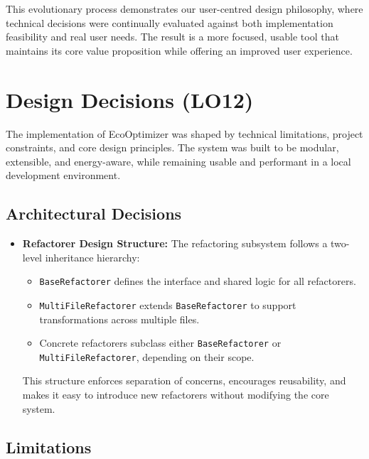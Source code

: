 \documentclass{article}
\begin{document}
This evolutionary process demonstrates our user-centred design philosophy, where technical decisions were continually evaluated against both implementation feasibility and real user needs. The result is a more focused, usable tool that maintains its core value proposition while offering an improved user experience.


\section{Design Decisions (LO12)}

The implementation of EcoOptimizer was shaped by technical limitations, project constraints, and core design principles. The system was built to be modular, extensible, and energy-aware, while remaining usable and performant in a local development environment.

\subsection*{Architectural Decisions}

\begin{itemize}
    \item \textbf{Refactorer Design Structure:} The refactoring subsystem follows a two-level inheritance hierarchy:
    \begin{itemize}
        \item \texttt{BaseRefactorer} defines the interface and shared logic for all refactorers.
        \item \texttt{MultiFileRefactorer} extends \texttt{BaseRefactorer} to support transformations across multiple files.
        \item Concrete refactorers subclass either \texttt{BaseRefactorer} or \texttt{MultiFileRefactorer}, depending on their scope.
    \end{itemize}
    This structure enforces separation of concerns, encourages reusability, and makes it easy to introduce new refactorers without modifying the core system.
\end{itemize}

\subsection*{Limitations}
\end{document}
